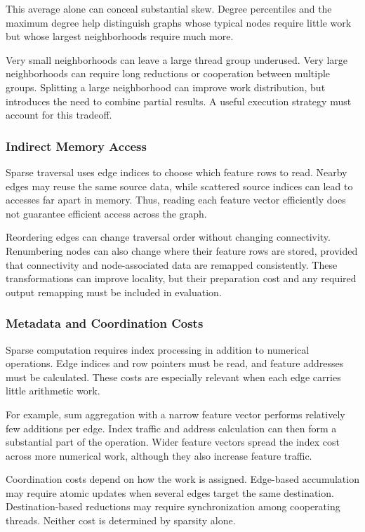 This average alone can conceal substantial skew. Degree percentiles and the maximum degree help distinguish graphs whose typical nodes require little work but whose largest neighborhoods require much more.

Very small neighborhoods can leave a large thread group underused. Very large neighborhoods can require long reductions or cooperation between multiple groups. Splitting a large neighborhood can improve work distribution, but introduces the need to combine partial results. A useful execution strategy must account for this tradeoff.

\subsubsection{Indirect Memory Access}

Sparse traversal uses edge indices to choose which feature rows to read. Nearby edges may reuse the same source data, while scattered source indices can lead to accesses far apart in memory. Thus, reading each feature vector efficiently does not guarantee efficient access across the graph.

Reordering edges can change traversal order without changing connectivity. Renumbering nodes can also change where their feature rows are stored, provided that connectivity and node-associated data are remapped consistently. These transformations can improve locality, but their preparation cost and any required output remapping must be included in evaluation.

\subsubsection{Metadata and Coordination Costs}

Sparse computation requires index processing in addition to numerical operations. Edge indices and row pointers must be read, and feature addresses must be calculated. These costs are especially relevant when each edge carries little arithmetic work.

For example, sum aggregation with a narrow feature vector performs relatively few additions per edge. Index traffic and address calculation can then form a substantial part of the operation. Wider feature vectors spread the index cost across more numerical work, although they also increase feature traffic.

Coordination costs depend on how the work is assigned. Edge-based accumulation may require atomic updates when several edges target the same destination. Destination-based reductions may require synchronization among cooperating threads. Neither cost is determined by sparsity alone.

